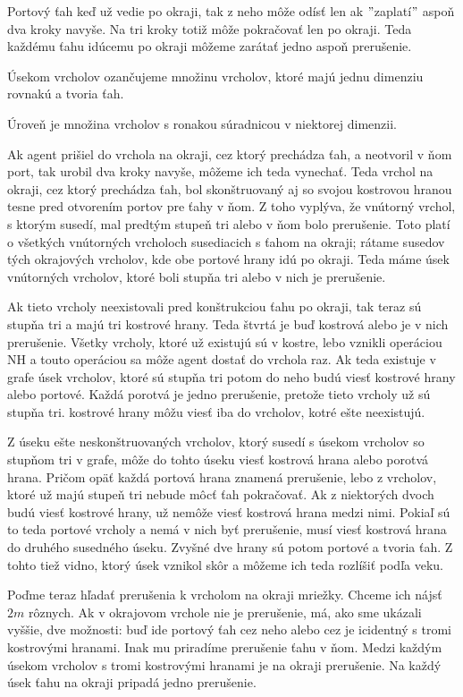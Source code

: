 Portový ťah keď už vedie po okraji, tak z neho môže odísť len ak
$"$zaplatí$"$ aspoň dva kroky navyše. Na tri kroky totiž môže pokračovať len
po okraji. Teda každému ťahu idúcemu po okraji môžeme zarátať jedno aspoň
prerušenie.

\begin{ozn}
Úsekom vrcholov ozančujeme množinu vrcholov, ktoré majú jednu dimenziu
rovnakú a tvoria ťah.

Úroveň je množina vrcholov s ronakou súradnicou v niektorej dimenzii.
\end{ozn}

Ak agent prišiel do vrchola na okraji, cez ktorý prechádza ťah, a neotvoril
v ňom port, tak urobil dva kroky navyše, môžeme ich teda vynechať. Teda vrchol
na okraji, cez ktorý prechádza ťah, bol skonštruovaný aj so svojou kostrovou 
hranou tesne pred otvorením portov pre ťahy v ňom. Z toho vyplýva, že
vnútorný vrchol, s ktorým susedí, mal predtým stupeň tri alebo v ňom bolo
prerušenie. Toto platí o všetkých vnútorných vrcholoch susediacich s ťahom
na okraji; rátame susedov tých okrajových vrcholov, kde obe portové hrany
idú po okraji. Teda máme úsek vnútorných vrcholov, ktoré boli stupňa tri
alebo v nich je prerušenie.


Ak tieto vrcholy neexistovali pred konštrukciou
ťahu po okraji, tak teraz sú stupňa tri a majú tri kostrové hrany. Teda
štvrtá je buď kostrová alebo je v nich prerušenie.
Všetky vrcholy, ktoré už existujú sú v kostre, lebo vznikli operáciou NH a
touto operáciou sa môže agent dostať do vrchola raz. Ak teda existuje v
grafe úsek
vrcholov, ktoré sú stupňa tri potom do neho budú viesť kostrové hrany alebo
portové. Každá porotvá je jedno prerušenie, pretože tieto vrcholy už sú
stupňa tri. kostrové hrany môžu viesť iba do vrcholov, kotré ešte
neexistujú.

Z úseku ešte neskonštruovaných vrcholov, ktorý susedí s úsekom vrcholov so
stupňom tri v grafe, môže do tohto úseku viesť kostrová hrana alebo porotvá
hrana. Pričom opäť každá portová hrana znamená prerušenie, lebo z vrcholov,
ktoré už majú stupeň tri nebude môcť ťah pokračovať. Ak z niektorých dvoch
budú viesť kostrové hrany, už nemôže viesť kostrová hrana medzi nimi. Pokiaľ
sú to teda portové vrcholy a nemá v nich byť prerušenie, musí viesť kostrová
hrana do druhého susedného úseku. Zvyšné dve hrany sú potom portové a tvoria
ťah. Z tohto tiež vidno, ktorý úsek vznikol skôr a môžeme ich teda rozlíšiť
podľa veku.

Poďme teraz hľadať prerušenia k vrcholom na  okraji mriežky. 
Chceme ich nájsť $2m$ rôznych. Ak
v okrajovom vrchole nie je prerušenie, má, ako sme ukázali vyššie, 
dve možnosti: 
buď ide portový ťah cez neho alebo cez je icidentný s tromi kostrovými
hranami. Inak mu priradíme prerušenie ťahu v ňom. Medzi každým úsekom
vrcholov s tromi kostrovými hranami je na okraji prerušenie. Na každý úsek
ťahu na okraji pripadá jedno prerušenie.

